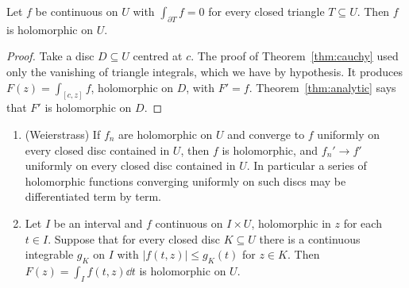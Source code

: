 \begin{theorem}[Morera]\label{thm:morera}
Let $f$ be continuous on $U$ with $\int_{\partial T}f=0$ for every closed triangle $T\subseteq U$. Then $f$ is holomorphic on $U$.
\end{theorem}
\begin{proof}
Take a disc $D\subseteq U$ centred at $c$. The proof of Theorem~\ref{thm:cauchy} used only the vanishing of triangle integrals, which we have by hypothesis. It produces $F(z)=\int_{[c,z]}f$, holomorphic on $D$, with $F'=f$. Theorem~\ref{thm:analytic} says that $F'$ is holomorphic on $D$.
\end{proof}

\begin{theorem}\label{thm:holoparam}
\begin{enumerate}[label=(\alph*)]
\item (Weierstrass) If $f_n$ are holomorphic on $U$ and converge to $f$ uniformly on every closed disc contained in $U$, then $f$ is
holomorphic, and $f_n'\to f'$ uniformly on every closed disc contained in $U$. In particular a series of holomorphic functions converging
uniformly on such discs may be differentiated term by term.
\item Let $I$ be an interval and $f$ continuous on $I\times U$, holomorphic in $z$ for each $t\in I$. Suppose that for every closed disc
$K\subseteq U$ there is a continuous integrable $g_K$ on $I$ with $|f(t,z)|\le g_K(t)$ for $z\in K$. Then $F(z)=\int_If(t,z)\dd t$ is holomorphic on $U$.
\end{enumerate}
\end{theorem}

